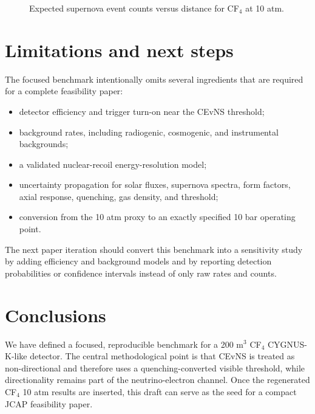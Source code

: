 \documentclass[a4paper,11pt]{article}
\begin{document}
\begin{figure}[htbp]
\centering
{}
\caption{Expected supernova event counts versus distance for CF$_4$ at 10 atm.}
\label{fig:sn-distance}
\end{figure}

\section{Limitations and next steps}
\label{sec:limitations}

The focused benchmark intentionally omits several ingredients that are required
for a complete feasibility paper:
\begin{itemize}
\item detector efficiency and trigger turn-on near the CEvNS threshold;
\item background rates, including radiogenic, cosmogenic, and instrumental
backgrounds;
\item a validated nuclear-recoil energy-resolution model;
\item uncertainty propagation for solar fluxes, supernova spectra, form
factors, axial response, quenching, gas density, and threshold;
\item conversion from the 10 atm proxy to an exactly specified 10 bar operating
point.
\end{itemize}

The next paper iteration should convert this benchmark into a sensitivity
study by adding efficiency and background models and by reporting detection
probabilities or confidence intervals instead of only raw rates and counts.

\section{Conclusions}
\label{sec:conclusions}

We have defined a focused, reproducible benchmark for a 200 m$^3$ CF$_4$
CYGNUS-K-like detector. The central methodological point is that CEvNS is
treated as non-directional and therefore uses a quenching-converted visible
threshold, while directionality remains part of the neutrino-electron channel.
Once the regenerated CF$_4$ 10 atm results are inserted, this draft can serve
as the seed for a compact JCAP feasibility paper.
\end{document}
